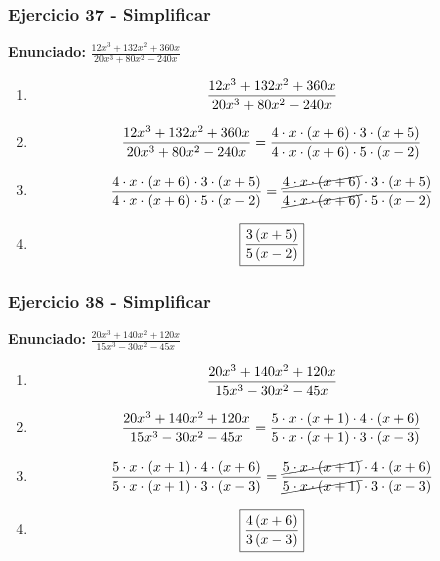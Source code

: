 \documentclass[11pt,a4paper]{article}
\newcommand{\fitmath}[1]{%
\[
\setbox0=\hbox{$\displaystyle #1$}%
\ifdim\wd0>\linewidth
\resizebox{\linewidth}{!}{$\displaystyle #1$}%
\else
#1%
\fi
\]
}
\begin{document}
\vspace{0.12cm}
\subsubsection*{Ejercicio 37 - Simplificar}
\textbf{Enunciado:} $ \frac{12 x^{3} + 132 x^{2} + 360 x}{20 x^{3} + 80 x^{2} - 240 x} $\par
\begin{enumerate}[leftmargin=2em]
\item \fitmath{\frac{12 x^{3} + 132 x^{2} + 360 x}{20 x^{3} + 80 x^{2} - 240 x}}
\item \fitmath{\frac{12 x^{3} + 132 x^{2} + 360 x}{20 x^{3} + 80 x^{2} - 240 x}=\frac{4\cdot x\cdot \left(x + 6\right)\cdot 3\cdot \left(x + 5\right)}{4\cdot x\cdot \left(x + 6\right)\cdot 5\cdot \left(x - 2\right)}}
\item \fitmath{\frac{4\cdot x\cdot \left(x + 6\right)\cdot 3\cdot \left(x + 5\right)}{4\cdot x\cdot \left(x + 6\right)\cdot 5\cdot \left(x - 2\right)}=\frac{\cancel{4\cdot x\cdot \left(x + 6\right)}\cdot 3\cdot \left(x + 5\right)}{\cancel{4\cdot x\cdot \left(x + 6\right)}\cdot 5\cdot \left(x - 2\right)}}
\item \fitmath{\boxed{\frac{3 \left(x + 5\right)}{5 \left(x - 2\right)}}}
\end{enumerate}

\vspace{0.12cm}
\subsubsection*{Ejercicio 38 - Simplificar}
\textbf{Enunciado:} $ \frac{20 x^{3} + 140 x^{2} + 120 x}{15 x^{3} - 30 x^{2} - 45 x} $\par
\begin{enumerate}[leftmargin=2em]
\item \fitmath{\frac{20 x^{3} + 140 x^{2} + 120 x}{15 x^{3} - 30 x^{2} - 45 x}}
\item \fitmath{\frac{20 x^{3} + 140 x^{2} + 120 x}{15 x^{3} - 30 x^{2} - 45 x}=\frac{5\cdot x\cdot \left(x + 1\right)\cdot 4\cdot \left(x + 6\right)}{5\cdot x\cdot \left(x + 1\right)\cdot 3\cdot \left(x - 3\right)}}
\item \fitmath{\frac{5\cdot x\cdot \left(x + 1\right)\cdot 4\cdot \left(x + 6\right)}{5\cdot x\cdot \left(x + 1\right)\cdot 3\cdot \left(x - 3\right)}=\frac{\cancel{5\cdot x\cdot \left(x + 1\right)}\cdot 4\cdot \left(x + 6\right)}{\cancel{5\cdot x\cdot \left(x + 1\right)}\cdot 3\cdot \left(x - 3\right)}}
\item \fitmath{\boxed{\frac{4 \left(x + 6\right)}{3 \left(x - 3\right)}}}
\end{enumerate}
\end{document}
